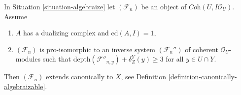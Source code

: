 %
\begin{lemma}
\label{lemma-cd-1-canonical}
In Situation \ref{situation-algebraize} let $(\mathcal{F}_n)$
be an object of $\textit{Coh}(U, I\mathcal{O}_U)$. Assume
\begin{enumerate}
\item $A$ has a dualizing complex and $\text{cd}(A, I) = 1$,
\item $(\mathcal{F}_n)$ is pro-isomorphic to an inverse system
$(\mathcal{F}_n'')$ of coherent $\mathcal{O}_U$-modules such that
$\text{depth}(\mathcal{F}''_{n, y}) + \delta^Y_Z(y) \geq 3$
for all $y \in U \cap Y$.
\end{enumerate}
Then $(\mathcal{F}_n)$ extends canonically to $X$, see
Definition \ref{definition-canonically-algebraizable}.
\end{lemma}

